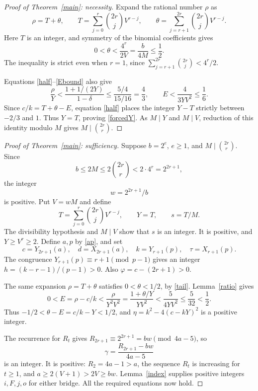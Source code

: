 \documentclass[11pt]{article}
\begin{document}
\begin{proof}[Proof of Theorem~\ref{main}: necessity]
Expand the rational number \(\rho\) as
\[
 \rho=T+\theta,\qquad
 T=\sum_{j=0}^r\binom{2r}{j}V^{r-j},\qquad
 \theta=\sum_{j=r+1}^{2r}\binom{2r}{j}V^{r-j}.
\]
Here \(T\) is an integer, and symmetry of the binomial
coefficients gives
\begin{equation}\label{tail}
 0<\theta<\frac{4^r}{2V}
        =\frac{b}{4M}\le\frac12.
\end{equation}
The inequality is strict even when \(r=1\), since
\(\sum_{j=r+1}^{2r}\binom{2r}{j}<4^r/2\).

Equations \eqref{half}--\eqref{Ebound} also give
\[
 \frac\rho Y<\frac{1+1/(2Y)}{1-\delta}
             \le\frac{5/4}{15/16}=\frac43,
 \qquad E<\frac4{3YV^2}\le\frac16.
\]
Since \(c/k=T+\theta-E\), equation \eqref{half} places
the integer \(Y-T\) strictly between \(-2/3\) and \(1\).
Thus \(Y=T\), proving \eqref{forcedY}.
As \(M\mid Y\) and \(M\mid V\), reduction of this identity
modulo \(M\) gives \(M\mid\binom{2r}{r}\).
\end{proof}

\begin{proof}[Proof of Theorem~\ref{main}: sufficiency]
Suppose \(b=2^e\), \(e\ge1\), and
\(M\mid\binom{2r}{r}\).  Since
\[
      b\le2M\le2\binom{2r}{r}<2\cdot4^r=2^{2r+1},
\]
the integer
\[
                         w=2^{2r+1}/b
\]
is positive.  Put \(V=wM\) and define
\[
 T=\sum_{j=0}^r\binom{2r}{j}V^{r-j},\qquad
 Y=T,\qquad s=T/M.
\]
The divisibility hypothesis and \(M\mid V\) show that \(s\)
is an integer.  It is positive, and \(Y\ge V^r\ge2\).
Define \(a,p\) by \eqref{ap}, and set
\[
 c=Y_{2r+1}(a),\quad d=X_{2r+1}(a),\quad
 k=Y_{r+1}(p),\quad \tau=X_{r+1}(p).
\]
The congruence \(Y_{r+1}(p)\equiv r+1\pmod{p-1}\)
gives an integer \(h=(k-r-1)/(p-1)>0\).
Also \(\varphi=c-(2r+1)>0\).

The same expansion \(\rho=T+\theta\) satisfies
\(0<\theta<1/2\), by \eqref{tail}.  Lemma~\ref{ratio} gives
\[
 0<E=\rho-c/k<\frac{\rho}{Y^2V^2}
       =\frac{1+\theta/Y}{YV^2}
       <\frac5{4YV^2}\le\frac5{32}<\frac12.
\]
Thus \(-1/2<\theta-E=c/k-Y<1/2\), and
\(\eta=k^2-4(c-kY)^2\) is a positive integer.

The recurrence for \(R_t\) gives
\(R_{2r+1}\equiv2^{2r+1}=bw\pmod{4a-5}\), so
\[
                    \gamma=\frac{R_{2r+1}-bw}{4a-5}
\]
is an integer.  It is positive: \(R_2=4a-1>a\), the
sequence \(R_t\) is increasing for \(t\ge1\), and
\(a\ge2(V+1)>2V\ge bw\).  Lemma~\ref{index} supplies
positive integers \(i,F,j,o\) for either bridge.
All the required equations now hold.
\end{proof}
\end{document}
